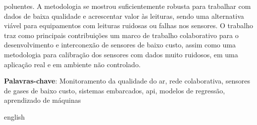 \begin{resumo}
poluentes. A metodologia se mostrou suficientemente robusta para trabalhar com dados de baixa qualidade e acrescentar valor às leituras, sendo uma alternativa viável para equipamentos com leituras ruidosas ou falhas nos sensores. O trabalho traz como principais contribuições um marco de trabalho colaborativo para o desenvolvimento e interconexão de sensores de baixo custo, assim como uma metodologia para calibração dos sensores com dados muito ruidosos, em uma aplicação real e em ambiente não controlado.
	
	\textbf{Palavras-chave}: Monitoramento da qualidade do ar, rede colaborativa, sensores de gases de baixo custo, sistemas embarcados, \acrshort{api}, modelos de regressão, aprendizado de máquinas
\end{resumo}

\begin{resumo}[Abstract]
	\SingleSpacing
	\begin{otherlanguage*}{english}

\end{otherlanguage*}
\end{resumo}

